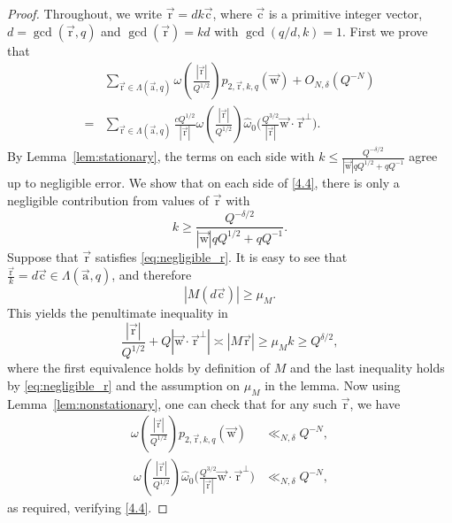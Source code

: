 \documentclass[letterpaper,11pt]{amsart}
\numberwithin{equation}{section}
\theoremstyle{definition}
\numberwithin{equation}{section}
\renewcommand{\hat}{\widehat}
\newcommand{\ua}{\vec{\mathrm{a}}}
\newcommand{\ur}{\vec{\mathrm{r}}}
\newcommand{\uw}{{\vec{\mathrm{w}}}}
\newcommand{\uc}{{\vec{\mathrm{c}}}}
\renewcommand{\hat}{\widehat}
\begin{document}
\begin{proof}
	Throughout, we write $\ur=dk\uc$, where $\uc$ is a primitive integer vector, \(d=\gcd(\ur,q)\) and $\gcd(\ur)=kd$ with $\gcd(q/d,k)=1$.
	First we prove that
	\begin{equation}\begin{split}
    \label{4.4}
		&\sum_{{\ur\in\Lambda(\ua,q)}}
		\omega\left(
		\frac{ |\ur| }{ Q^{1/2}}
		\right)
		p_{2,\ur,k,q}(\uw)+O_{N,\delta}(Q^{-N})
		\\=&
		\sum_{{\ur\in\Lambda(\ua,q)}}
		\frac{cQ^{1/2}}{|\ur|}
		\omega\left(
		\frac{ |\ur| }{ Q^{1/2}}
		\right)
		\hat{\omega}_0
		\Big(
		\frac{Q^{3/2}}{|\ur|} \uw\cdot\ur^\perp
		\Big).
        \end{split}
	\end{equation}
	By Lemma~\ref{lem:stationary}, the terms on each side with \(
	k\leq  \frac{Q^{-\delta/2}}{|\uw|qQ^{1/2}+qQ^{-1}}\) agree up to negligible error. We show that on each side of \eqref{4.4}, there is only a negligible contribution from values of \(\ur\) with
	\begin{equation}\label{eq:negligible_r}
	k\geq  \frac{Q^{-\delta/2}}{|\uw|qQ^{1/2}+qQ^{-1}}.
\end{equation}
	Suppose that \(\ur\) satisfies
	  \eqref{eq:negligible_r}. It is easy to see that \(	\frac{\ur} {k}=d\uc \in{\Lambda(\ua, q)}\), and therefore
	\[
	\left\lvert M(d\uc)\right\rvert \geq \mu_M.
	\]
	This yields the penultimate inequality in
	\[
	\frac{ |\ur| }{ Q^{1/2}}
+
	Q |\uw\cdot\ur^\perp|
	\asymp |M\ur|\geq \mu_Mk
	\geq
	{Q^{\delta/2}},
	\]
    where the first equivalence holds by definition of $M$ and the last inequality holds by
	 \eqref{eq:negligible_r} and the assumption on \(\mu_M\) in the lemma.
	Now using Lemma~\ref{lem:nonstationary}, one can check that for any such \(\ur\), we have
	\begin{align*}
		\omega\left(
		\frac{ |\ur| }{ Q^{1/2}}
		\right)
		p_{2,\ur,k,q}(\uw)
		&\ll_{N,\delta}Q^{-N},
		\\\
		\omega\left(
		\frac{ |\ur| }{ Q^{1/2}}
		\right)
		\hat{\omega}_0
		\Big(
		\frac{Q^{3/2}}{|\ur|} \uw\cdot\ur^\perp
		\Big)
		&\ll_{N,\delta}Q^{-N},
	\end{align*}
as required, verifying \eqref{4.4}.


\end{proof}
\end{document}
